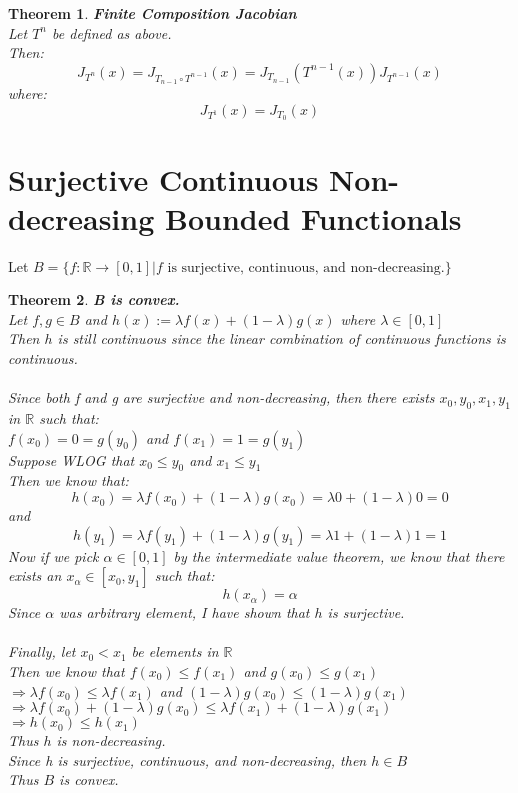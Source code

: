 \documentclass[12pt]{extarticle}
\theoremstyle{plain}
\newtheorem{thm}{Theorem}[section]
\theoremstyle{Definition}
\theoremstyle{Definition}
\theoremstyle{plain}
\begin{document}
\begin{thm} \textbf{Finite Composition Jacobian} \\ 
	Let $T^n$ be defined as above. \\ 
	Then: 
	$$J_{T^n}(x) = J_{T_{n-1} \circ T^{n-1}}(x) = J_{T_{n-1}}(T^{n-1}(x))J_{T^{n-1}}(x) $$
	where: 
	$$J_{T^1}(x) = J_{T_0}(x)$$	

\end{thm}


\newpage
\section{Surjective Continuous Non-decreasing Bounded Functionals}
	Let $B = \{f : \mathbb{R} \to [0,1] | f \text{ is surjective, continuous, and non-decreasing.}\}$ \\ 
	\begin{thm} \textbf{B is convex. } \\
			Let $f,g \in B$ and $h(x) := \lambda f(x) + (1-\lambda)g(x)$ where $\lambda \in [0,1]$ \\ 
			Then $h$ is still continuous since the linear combination of continuous functions is continuous.  \\ \\
			Since both f and g are surjective and non-decreasing, then there exists $x_0,y_0,x_1,y_1$ in $\mathbb{R}$ such that: \\ 
			$f(x_0) = 0 = g(y_0)$ and $f(x_1) = 1 = g(y_1)$ \\ 
			Suppose WLOG that $x_0 \leq y_0$ and $x_1 \leq y_1$ \\
			Then we know that: 
			$$h(x_0) = \lambda f(x_0) + (1-\lambda)g(x_0) = \lambda 0 + (1-\lambda)0 = 0$$
			and 
			$$h(y_1) = \lambda f(y_1) + (1-\lambda)g(y_1) = \lambda 1 + (1-\lambda)1 = 1$$
			Now if we pick $\alpha \in [0,1]$ by the intermediate value theorem, we know that there exists an $x_\alpha \in [x_0,y_1]$ such that: 
			$$h(x_\alpha) = \alpha$$
			Since $\alpha$ was arbitrary element, I have shown that $h$ is surjective. \\ \\
			Finally, let $x_0 < x_1$ be elements in $\mathbb{R}$ \\ 
			Then we know that $f(x_0) \leq f(x_1)$ and $g(x_0) \leq g(x_1)$ \\ 
			$\Rightarrow \lambda f(x_0) \leq \lambda f(x_1)$ and $(1-\lambda)g(x_0) \leq (1-\lambda)g(x_1)$ \\ 
			$\Rightarrow \lambda f(x_0) + (1-\lambda)g(x_0) \leq \lambda f(x_1) + (1-\lambda)g(x_1)$ \\ 
			$\Rightarrow h(x_0) \leq h(x_1)$ \\ 
			Thus $h$ is non-decreasing. \\ 
			Since h is surjective, continuous, and non-decreasing, then $h \in B$ \\ 
			Thus $B$ is convex. 
	\end{thm}
\end{document}
